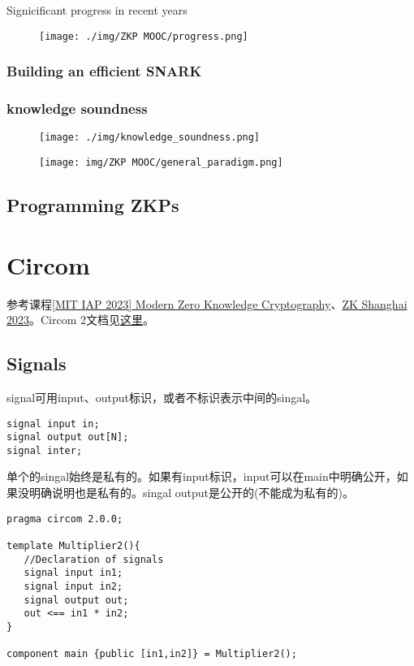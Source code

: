 \documentclass[10pt]{ctexart}
\begin{document}
Signicificant progress in recent years
\begin{figure}[H]
    \centering
    \texttt{[image: ./img/ZKP MOOC/progress.png]} 
\end{figure}

\subsubsection{Building an efficient SNARK}

\subsubsection*{knowledge soundness}

\begin{figure}[H]
    \centering
    \texttt{[image: ./img/knowledge\_soundness.png]} 
\end{figure}

\begin{figure}[H]
    \centering
    \texttt{[image: img/ZKP MOOC/general\_paradigm.png]} 
\end{figure}

 

\subsection{Programming ZKPs}
 

\section{Circom}
参考课程\href{https://zkiap.com/}{[MIT IAP 2023] Modern Zero Knowledge Cryptography}、\href{https://zkshanghai.xyz/}{ZK Shanghai 2023}。Circom 2文档见\href{https://docs.circom.io/circom-language/signals/}{这里}。

\subsection{Signals}
signal可用input、output标识，或者不标识表示中间的singal。
\begin{lstlisting}
signal input in;
signal output out[N];
signal inter;
\end{lstlisting}
单个的singal始终是私有的。如果有input标识，input可以在main中明确公开，如果没明确说明也是私有的。singal output是公开的(不能成为私有的)。
\begin{lstlisting}
pragma circom 2.0.0;

template Multiplier2(){
   //Declaration of signals
   signal input in1;
   signal input in2;
   signal output out;
   out <== in1 * in2;
}

component main {public [in1,in2]} = Multiplier2();
\end{lstlisting}
\end{document}
